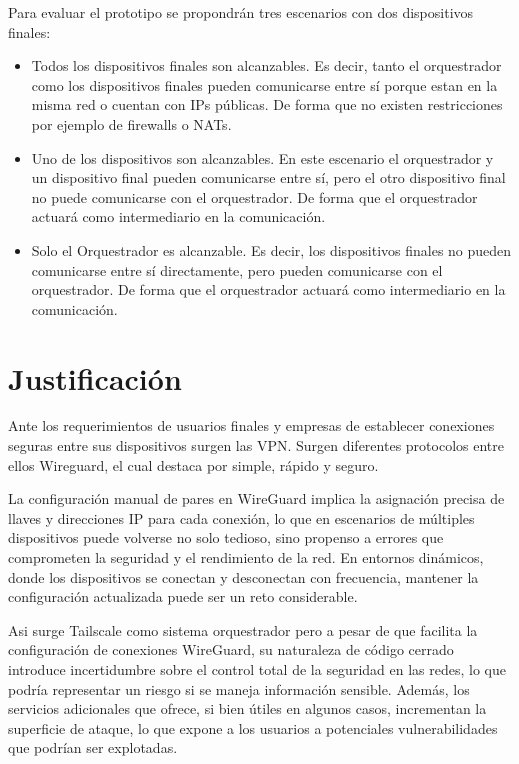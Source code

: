 \documentclass[letterpaper,12pt,oneside]{book}
\begin{document}
Para evaluar el prototipo se propondrán tres escenarios con dos dispositivos finales:
\begin{itemize}
    \item Todos los dispositivos finales son alcanzables. Es decir, tanto el orquestrador como los dispositivos finales pueden comunicarse entre sí porque estan en la misma red o cuentan con IPs públicas. De forma que no existen restricciones por ejemplo de firewalls o NATs.
    
    \item Uno de los dispositivos son alcanzables. En este escenario el orquestrador y un dispositivo final pueden comunicarse entre sí, pero el otro dispositivo final no puede comunicarse con el orquestrador. De forma que el orquestrador actuará como intermediario en la comunicación.

    \item Solo el Orquestrador es alcanzable. Es decir, los dispositivos finales no pueden comunicarse entre sí directamente, pero pueden comunicarse con el orquestrador. De forma que el orquestrador actuará como intermediario en la comunicación.
\end{itemize}
\section{Justificación}
    
Ante los requerimientos de usuarios finales y empresas de establecer conexiones seguras entre sus dispositivos surgen las VPN. Surgen diferentes protocolos entre ellos Wireguard, el cual destaca por simple, rápido y seguro. 


La configuración manual de pares en WireGuard implica la asignación precisa de llaves y direcciones IP para cada conexión, lo que en escenarios de múltiples dispositivos puede volverse no solo tedioso, sino propenso a errores que comprometen la seguridad y el rendimiento de la red. En entornos dinámicos, donde los dispositivos se conectan y desconectan con frecuencia, mantener la configuración actualizada puede ser un reto considerable.

Asi surge Tailscale como sistema orquestrador pero a pesar de que facilita la configuración de conexiones WireGuard, su naturaleza de código cerrado introduce incertidumbre sobre el control total de la seguridad en las redes, lo que podría representar un riesgo si se maneja información sensible. Además, los servicios adicionales que ofrece, si bien útiles en algunos casos, incrementan la superficie de ataque, lo que expone a los usuarios a potenciales vulnerabilidades que podrían ser explotadas.
\end{document}
